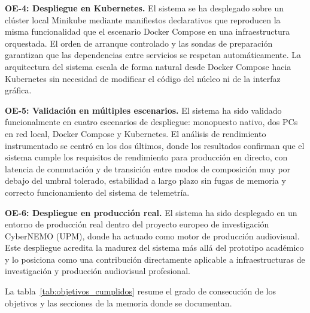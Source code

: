 \vspace{0.2cm}
\noindent\textbf{OE-4: Despliegue en Kubernetes.}
El sistema se ha desplegado sobre un clúster local Minikube mediante manifiestos declarativos
que reproducen la misma funcionalidad que el escenario Docker Compose en una
infraestructura orquestada. El orden de arranque controlado y las sondas de preparación
garantizan que las dependencias entre servicios se respetan automáticamente. La
arquitectura del sistema escala de forma natural desde Docker Compose hacia Kubernetes
sin necesidad de modificar el código del núcleo ni de la interfaz gráfica.

\vspace{0.2cm}
\noindent\textbf{OE-5: Validación en múltiples escenarios.}
El sistema ha sido validado funcionalmente en cuatro escenarios de despliegue:
monopuesto nativo, dos PCs en red local, Docker Compose y Kubernetes. El análisis
de rendimiento instrumentado se centró en los dos últimos, donde los resultados
confirman que el sistema cumple los requisitos de rendimiento para producción en
directo, con latencia de conmutación y de transición entre modos de composición
muy por debajo del umbral tolerado, estabilidad a largo plazo sin fugas de memoria
y correcto funcionamiento del sistema de telemetría.

\vspace{0.2cm}
\noindent\textbf{OE-6: Despliegue en producción real.}
El sistema ha sido desplegado en un entorno de producción real dentro del proyecto
europeo de investigación CyberNEMO (UPM), donde ha actuado como motor de
producción audiovisual. Este despliegue acredita la madurez del sistema más allá
del prototipo académico y lo posiciona como una contribución directamente aplicable
a infraestructuras de investigación y producción audiovisual profesional.

\vspace{0.4cm}
La tabla~\ref{tab:objetivos_cumplidos} resume el grado de consecución de los objetivos
y las secciones de la memoria donde se documentan.

